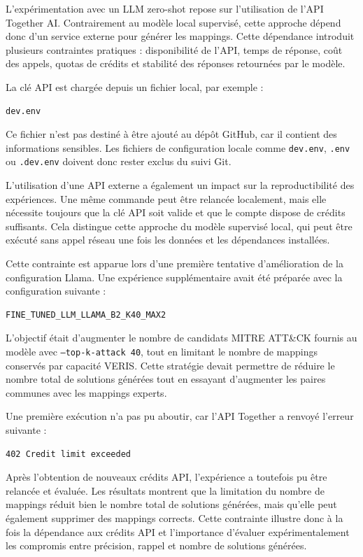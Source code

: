 \documentclass[a4paper,12pt]{article}
\begin{document}
L'expérimentation avec un LLM zero-shot repose sur l'utilisation de l'API Together AI. Contrairement au modèle local supervisé, cette approche dépend donc d'un service externe pour générer les mappings. Cette dépendance introduit plusieurs contraintes pratiques : disponibilité de l'API, temps de réponse, coût des appels, quotas de crédits et stabilité des réponses retournées par le modèle.

La clé API est chargée depuis un fichier local, par exemple :

\begin{verbatim}
dev.env
\end{verbatim}

Ce fichier n'est pas destiné à être ajouté au dépôt GitHub, car il contient des informations sensibles. Les fichiers de configuration locale comme \texttt{dev.env}, \texttt{.env} ou \texttt{.dev.env} doivent donc rester exclus du suivi Git.

L'utilisation d'une API externe a également un impact sur la reproductibilité des expériences. Une même commande peut être relancée localement, mais elle nécessite toujours que la clé API soit valide et que le compte dispose de crédits suffisants. Cela distingue cette approche du modèle supervisé local, qui peut être exécuté sans appel réseau une fois les données et les dépendances installées.

Cette contrainte est apparue lors d'une première tentative d'amélioration de la configuration Llama. Une expérience supplémentaire avait été préparée avec la configuration suivante :

\begin{verbatim}
FINE_TUNED_LLM_LLAMA_B2_K40_MAX2
\end{verbatim}

L'objectif était d'augmenter le nombre de candidats MITRE ATT\&CK fournis au modèle avec \texttt{--top-k-attack 40}, tout en limitant le nombre de mappings conservés par capacité VERIS. Cette stratégie devait permettre de réduire le nombre total de solutions générées tout en essayant d'augmenter les paires communes avec les mappings experts.

Une première exécution n'a pas pu aboutir, car l'API Together a renvoyé l'erreur suivante :

\begin{verbatim}
402 Credit limit exceeded
\end{verbatim}

Après l'obtention de nouveaux crédits API, l'expérience a toutefois pu être relancée et évaluée. Les résultats montrent que la limitation du nombre de mappings réduit bien le nombre total de solutions générées, mais qu'elle peut également supprimer des mappings corrects. Cette contrainte illustre donc à la fois la dépendance aux crédits API et l'importance d'évaluer expérimentalement les compromis entre précision, rappel et nombre de solutions générées.
\end{document}
